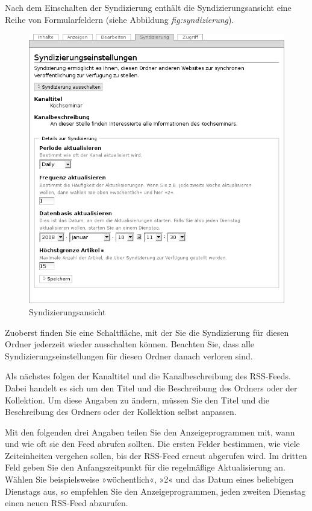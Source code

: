 \documentclass[a4paper,12pt,ngerman]{manual}
\begin{document}
Nach dem Einschalten der Syndizierung enthält die Syndizierungsansicht eine
Reihe von Formularfeldern (siehe Abbildung \emph{fig:syndizierung}).
\hypertarget{fig-syndizierung}{}\begin{figure}[htbp]
\centering

\includegraphics{syndizierung.png}
\caption{Syndizierungsansicht}\end{figure}

Zuoberst finden Sie eine Schaltfläche, mit der Sie die Syndizierung
für diesen Ordner jederzeit wieder ausschalten können. Beachten Sie,
dass alle Syndizierungseinstellungen für diesen Ordner danach verloren
sind.

Als nächstes folgen der Kanaltitel und die Kanalbeschreibung des RSS-Feeds.
Dabei handelt es sich um den Titel und die Beschreibung des Ordners oder der
Kollektion. Um diese Angaben zu ändern, müssen Sie den Titel und die
Beschreibung des Ordners oder der Kollektion selbst anpassen.

Mit den folgenden drei Angaben teilen Sie den Anzeigeprogrammen mit,
wann und wie oft sie den Feed abrufen sollten. Die ersten Felder bestimmen,
wie viele Zeiteinheiten vergehen sollen, bis der RSS-Feed erneut abgerufen
wird. Im dritten Feld geben Sie den Anfangszeitpunkt für
die regelmäßige Aktualisierung an. Wählen Sie
beispielsweise »wöchentlich«, »2« und das Datum eines beliebigen Dienstags
aus, so empfehlen Sie den Anzeigeprogrammen, jeden zweiten Dienstag
einen neuen RSS-Feed abzurufen.
\end{document}
